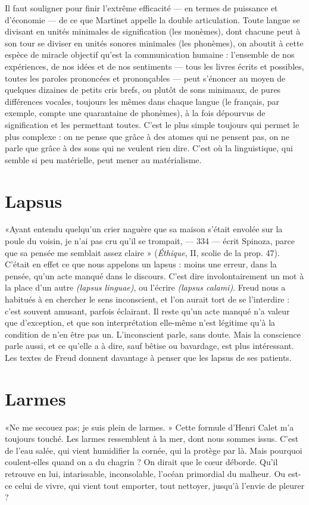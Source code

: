 {Il faut souligner pour finir l’extrême efficacité — en termes de puissance et
d'économie — de ce que Martinet appelle la double articulation. Toute langue
se divisant en unités minimales de signification (les monèmes), dont chacune
peut à son tour se diviser en unités sonores minimales (les phonèmes), on
aboutit à cette espèce de miracle objectif qu’est la communication humaine :
l’ensemble de nos expériences, de nos idées et de nos sentiments — tous les livres
écrits et possibles, toutes les paroles prononcées et prononçables — peut
s’énoncer au moyen de quelques dizaines de petits cris brefs, ou plutôt de sons
minimaux, de pures différences vocales, toujours les mêmes dans chaque langue
(le français, par exemple, compte une quarantaine de phonèmes), à la fois
dépourvus de signification et les permettant toutes. C’est le plus simple toujours
qui permet le plus complexe : on ne pense que grâce à des atomes qui ne
pensent pas, on ne parle que grâce à des sons qui ne veulent rien dire. C’est où
la linguistique, qui semble si peu matérielle, peut mener au matérialisme.

\section{Lapsus}
«Ayant entendu quelqu'un crier naguère que sa maison s'était
envolée sur la poule du voisin, je n’ai pas cru qu’il se trompait,
— 334 —
écrit Spinoza, parce que sa pensée me semblait assez claire » ({\it Éthique}, II, scolie
de la prop. 47). C'était en effet ce que nous appelons un lapsus : moins une
erreur, dans la pensée, qu’un acte manqué dans le discours. C’est dire involontairement
un mot à la place d’un autre {\it (lapsus linguae)}, ou l'écrire {\it (lapsus
calami)}. Freud nous a habitués à en chercher le sens inconscient, et l’on aurait
tort de se l’interdire : c’est souvent amusant, parfois éclairant. Il reste qu’un
acte manqué n’a valeur que d’exception, et que son interprétation elle-même
n'est légitime qu’à la condition de n’en être pas un. L’inconscient parle, sans
doute. Mais la conscience parle aussi, et ce qu’elle a à dire, sauf bêtise ou bavardage,
est plus intéressant. Les textes de Freud donnent davantage à penser que
les lapsus de ses patients.

\section{Larmes}
«Ne me secouez pas; je suis plein de larmes. » Cette formule
d'Henri Calet m'a toujours touché. Les larmes ressemblent à la
mer, dont nous sommes issus. C’est de l’eau salée, qui vient humidifier la
cornée, qui la protège par là. Mais pourquoi coulent-elles quand on a du
chagrin ? On dirait que le cœur déborde. Qu'il retrouve en lui, intarissable,
inconsolable, l'océan primordial du malheur. Ou est-ce celui de vivre, qui vient
tout emporter, tout nettoyer, jusqu’à l’envie de pleurer ?

}
